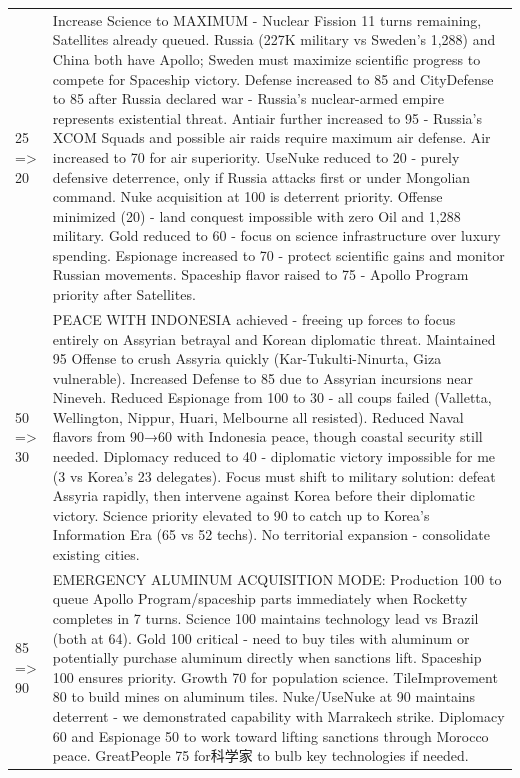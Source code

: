 \begin{longtable}{p{}p{}}
25 => 20 & Increase Science to MAXIMUM - Nuclear Fission 11 turns remaining, Satellites already queued. Russia (227K military vs Sweden's 1,288) and China both have Apollo; Sweden must maximize scientific progress to compete for Spaceship victory. Defense increased to 85 and CityDefense to 85 after Russia declared war - Russia's nuclear-armed empire represents existential threat. Antiair further increased to 95 - Russia's XCOM Squads and possible air raids require maximum air defense. Air increased to 70 for air superiority. UseNuke reduced to 20 - purely defensive deterrence, only if Russia attacks first or under Mongolian command. Nuke acquisition at 100 is deterrent priority. Offense minimized (20) - land conquest impossible with zero Oil and 1,288 military. Gold reduced to 60 - focus on science infrastructure over luxury spending. Espionage increased to 70 - protect scientific gains and monitor Russian movements. Spaceship flavor raised to 75 - Apollo Program priority after Satellites. \\
50 => 30 & PEACE WITH INDONESIA achieved - freeing up forces to focus entirely on Assyrian betrayal and Korean diplomatic threat. Maintained 95 Offense to crush Assyria quickly (Kar-Tukulti-Ninurta, Giza vulnerable). Increased Defense to 85 due to Assyrian incursions near Nineveh. Reduced Espionage from 100 to 30 - all coups failed (Valletta, Wellington, Nippur, Huari, Melbourne all resisted). Reduced Naval flavors from 90→60 with Indonesia peace, though coastal security still needed. Diplomacy reduced to 40 - diplomatic victory impossible for me (3 vs Korea's 23 delegates). Focus must shift to military solution: defeat Assyria rapidly, then intervene against Korea before their diplomatic victory. Science priority elevated to 90 to catch up to Korea's Information Era (65 vs 52 techs). No territorial expansion - consolidate existing cities. \\
85 => 90 & EMERGENCY ALUMINUM ACQUISITION MODE: Production 100 to queue Apollo Program/spaceship parts immediately when Rocketty completes in 7 turns. Science 100 maintains technology lead vs Brazil (both at 64). Gold 100 critical - need to buy tiles with aluminum or potentially purchase aluminum directly when sanctions lift. Spaceship 100 ensures priority. Growth 70 for population science. TileImprovement 80 to build mines on aluminum tiles. Nuke/UseNuke at 90 maintains deterrent - we demonstrated capability with Marrakech strike. Diplomacy 60 and Espionage 50 to work toward lifting sanctions through Morocco peace. GreatPeople 75 for科学家 to bulb key technologies if needed. \\

\end{longtable}

